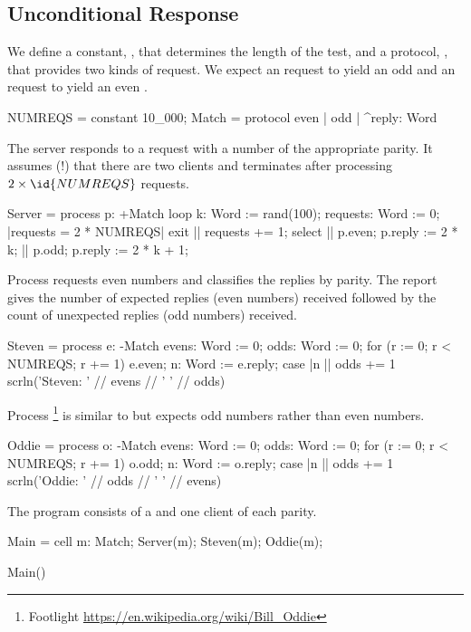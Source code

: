 \subsection{Unconditional Response}

We define a constant, , that determines the length of the test, and a protocol, , that provides two kinds of request.  We expect an  request to yield an odd  and an  request to yield an even .
\begin{code}
NUMREQS = constant 10_000;
Match = protocol { even | odd | ^reply: Word }
\end{code}

The server responds to a request with a number of the appropriate parity.  It assumes (!) that there are two clients and terminates after processing $2 \times \id{NUMREQS}$ requests.
\begin{code}
Server = process p: +Match
{
  loop k: Word := rand(100); requests: Word := 0;
  {
    |requests = 2 * NUMREQS| exit
    ||
      requests += 1;
      select
      {
        || p.even; p.reply := 2 * k;
        || p.odd; p.reply := 2 * k + 1;
      }
  }
}
\end{code}

Process  requests even numbers and classifies the replies by parity.  The report gives the number of expected replies (even numbers) received followed by the count of unexpected replies (odd numbers) received.
\begin{code}
Steven = process e: -Match
{
  evens: Word := 0;
  odds: Word := 0;
  for (r := 0; r < NUMREQS; r += 1)
  {
    e.even;
    n: Word := e.reply;
    case
    {
      |n %
      || odds += 1
    }
  }
  scrln('Steven: ' // evens // '  ' // odds)
}
\end{code}

Process  
\footnote{Footlight \url{https://en.wikipedia.org/wiki/Bill_Oddie}}
is similar to  but expects odd numbers rather than even numbers.
\begin{code}
Oddie = process o: -Match
{
  evens: Word := 0;
  odds: Word := 0;
  for (r := 0; r < NUMREQS; r += 1)
  {
    o.odd;
    n: Word := o.reply;
    case
    {
      |n %
      || odds += 1
    }
  }
  scrln('Oddie:  ' // odds // '  ' // evens)
}
\end{code}

The program consists of a  and one client of each parity.
\begin{code}
Main = cell
{
  m: Match;
  Server(m);
  Steven(m);
  Oddie(m);
}

Main()
\end{code}

